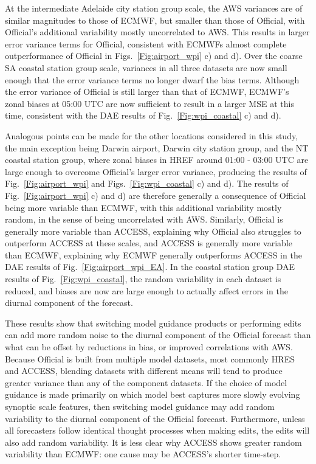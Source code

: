 \documentclass[twocol]{ametsoc}
\begin{document}
At the intermediate Adelaide city station group scale, the AWS variances are of similar magnitudes to those of ECMWF, but smaller than those of Official, with Official's additional variability mostly uncorrelated to AWS. This results in larger error variance terms for Official, consistent with ECMWFs almost complete outperformance of Official in Figs.~\ref{Fig:airport_wpi} c) and d). Over the coarse SA coastal station group scale, variances in all three datasets are now small enough that the error variance terms no longer dwarf the bias terms. Although the error variance of Official is still larger than that of ECMWF, ECMWF's zonal biases at 05:00 UTC are now sufficient to result in a larger MSE at this time, consistent with the DAE results of Fig.~\ref{Fig:wpi_coastal} c) and d). 

Analogous points can be made for the other locations considered in this study, the main exception being Darwin airport, Darwin city station group, and the NT coastal station group, where zonal biases in HREF around 01:00 - 03:00 UTC are large enough to overcome Official's larger error variance, producing the results of Fig.~\ref{Fig:airport_wpi} and Figs.~\ref{Fig:wpi_coastal} c) and d). The results of Fig.~\ref{Fig:airport_wpi} c) and d) are therefore generally a consequence of Official being more variable than ECMWF, with this additional variability mostly random, in the sense of being uncorrelated with AWS. Similarly, Official is generally more variable than ACCESS, explaining why Official also struggles to outperform ACCESS at these scales, and ACCESS is generally more variable than ECMWF, explaining why ECMWF generally outperforms ACCESS in the DAE results of Fig.~\ref{Fig:airport_wpi_EA}. In the coastal station group DAE results of Fig.~\ref{Fig:wpi_coastal}, the random variability in each dataset is reduced, and biases are now are large enough to actually affect errors in the diurnal component of the forecast.  

These results show that switching model guidance products or performing edits can add more random noise to the diurnal component of the Official forecast than what can be offset by reductions in bias, or improved correlations with AWS. Because Official is built from multiple model datasets, most commonly HRES and ACCESS, blending datasets with different means will tend to produce greater variance than any of the component datasets. If the choice of model guidance is made primarily on which model best captures more slowly evolving synoptic scale features, then switching model guidance may add random variability to the diurnal component of the Official forecast. Furthermore, unless all forecasters follow identical thought processes when making edits, the edits will also add random variability. It is less clear why ACCESS shows greater random variability than ECMWF: one cause may be ACCESS's shorter time-step.  
\end{document}
